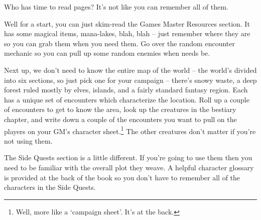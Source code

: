 \begin{multicols}{2}

Who has time to read \pageref{lastpage} pages?  It's not like you can remember all of them.

Well for a start, you can just skim-read the Games Master Resources section.  It has some magical items, mana-lakes, blah, blah -- just remember where they are so you can grab them when you need them.  Go over the random encounter mechanic so you can pull up some random enemies when needs be.

Next up, we don't need to know the entire map of the world -- the world's divided into six sections, so just pick one for your campaign -- there's snowy waste, a deep forest ruled mostly by elves, islands, and a fairly standard fantasy region.  Each has a unique set of encounters which characterize the location.  Roll up a couple of encounters to get to know the area, look up the creatures in the bestiary chapter, and write down a couple of the encounters you want to pull on the players on your GM's character sheet.\footnote{Well, more like a `campaign sheet'.  It's at the back.}  The other creatures don't matter if you're not using them.

The Side Quests section is a little different.  If you're going to use them then you need to be familiar with the overall plot they weave.  A helpful character glossary is provided at the back of the book so you don't have to remember all of the characters in the Side Quests.

\end{multicols}

